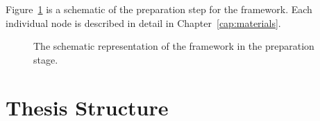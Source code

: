 Figure~\ref{fig-framework-prepare} is a schematic of the preparation step for the framework.
Each individual node is described in detail in Chapter~\ref{cap:materials}.


\begin{figure}
\caption[Schematic representation of the framework: preparation]{\label{fig-framework-prepare}The schematic representation of
the framework in the preparation stage.}
\end{figure}

\section{Thesis Structure}

